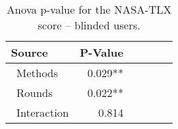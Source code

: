 
\begin{table}[!htb]
\centering
\caption{Anova p-value for the NASA-TLX score -- blinded users.}
\label{tab:blocanova_nasa_avg_two_way_blind}
\begin{tabular}{lrrrrl}
\toprule
          Source & P-Value \\
\midrule
    \    Methods & 0.029** \\
     \    Rounds & 0.022** \\
\    Interaction &   0.814 \\
\bottomrule
\end{tabular}
\end{table}

